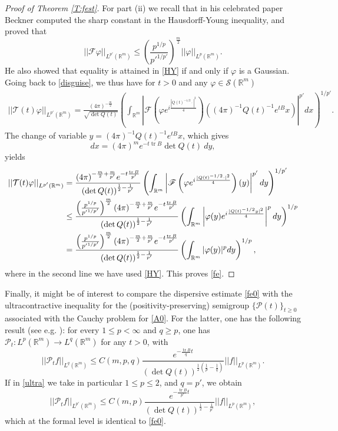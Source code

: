 \documentclass[11pt,a4paper]{amsart}
\def \vf{\varphi}
\newcommand{\Rm}{\mathbb R^m}
\numberwithin{equation}{section}
\newcommand{\tr}{\operatorname{tr}}
\numberwithin{equation}{section}
\begin{document}
\begin{proof}[Proof of Theorem \ref{T:fest}]
For part (ii) we recall that in his celebrated paper \cite{Be} Beckner  computed the sharp constant in the Hausdorff-Young inequality, and proved that 
\begin{equation}\label{HY}
||\mathscr F \vf||_{L^{p'}(\Rm)} \le \left(\frac{p^{1/p}}{{p'}^{1/p'}}\right)^{\frac m2} ||\vf||_{L^{p}(\Rm)}.
\end{equation}
He also showed that equality is attained in \eqref{HY} if and only if $\vf$ is a Gaussian.
Going back to \eqref{disguise}, we thus have for $t>0$ and any $\vf\in \mathscr S(\Rm)$
\begin{align*}
||\mathcal T(t) \vf||_{L^{p'}(\Rm)} = \frac{(4\pi
)^{-\frac{m}{2}}}{\sqrt{\det Q(t)}}\left(\int_{\Rm} \left|\mathscr F\left(\vf e^{i \frac{|Q(t)^{-1/2} \cdot|^2}{4}}\right)((4\pi)^{-1} Q(t)^{-1} e^{tB} x)\right|^{p'} dx\right)^{1/p'}.
\end{align*}
The change of variable $y = (4\pi)^{-1} Q(t)^{-1} e^{tB} x$, which gives 
\[
dx = (4\pi)^m e^{-t \tr B} \det Q(t)\ d y,
\]
yields
\begin{align*}
||\mathcal T(t) \vf||_{L^{p'}(\Rm)} & = \frac{(4\pi
)^{-\frac{m}{2}+\frac{m}{p'}} e^{-t {\frac{\tr B}{p'}}}}{(\det Q(t))^{\frac 12 - \frac 1{p'}}}\left(\int_{\Rm} \left|\mathscr F\left(\vf e^{i \frac{|Q(t)^{-1/2} \cdot|^2}{4}}\right)(y)\right|^{p'} dy\right)^{1/p'}
\\
& \le \frac{\left(\frac{p^{1/p}}{{p'}^{1/p'}}\right)^{\frac m2}(4\pi
)^{-\frac{m}{2}+\frac{m}{p'}} e^{-t {\frac{\tr B}{p'}}}}{(\det Q(t))^{\frac 12 - \frac 1{p'}}}\left(\int_{\Rm} \left|\vf(y) e^{i \frac{|Q(t)^{-1/2} y|^2}{4}}\right|^{p} dy\right)^{1/p}
\notag
\\
& = \frac{\left(\frac{p^{1/p}}{{p'}^{1/p'}}\right)^{\frac m2} (4\pi
)^{-\frac{m}{2}+\frac{m}{p'}} e^{-t {\frac{\tr B}{p'}}}}{(\det Q(t))^{\frac 12 - \frac 1{p'}}}\left(\int_{\Rm} |\vf(y)|^{p} dy\right)^{1/p},
\notag
\end{align*}
where in the second line we have used \eqref{HY}. This proves \eqref{fe}.
\end{proof}

Finally, it might be of interest to compare the dispersive estimate \eqref{fe0} with the ultracontractive inequality for the (positivity-preserving) semigroup $\{\mathcal P(t)\}_{t\ge 0}$ associated with the Cauchy problem for \eqref{A0}. For the latter, one has the following result (see e.g. \cite[Proposition 2.3]{G&liarNA}): for every $1\leq p< \infty$ and $q\geq p$, one has $\mathcal P_t: L^p(\Rm) \to L^q(\Rm)$ for any $t>0$, with
\begin{equation}\label{ultra}
||\mathcal P_t f||_{L^q(\Rm)} \le C(m,p,q) \frac{e^{- \frac{\operatorname{tr} B}{q} t}}{(\det Q(t))^{\frac 12(\frac{1}{p}-\frac{1}{q})}} ||f||_{L^p(\Rm)}.
\end{equation}
If in \eqref{ultra} we take in particular $1\le p\le 2$, and $q = p'$, we obtain 
\begin{equation*}
||\mathcal P_t f||_{L^{p'}(\Rm)} \le C(m,p) \frac{e^{-  \frac{\operatorname{tr} B}{p'} t}}{(\det Q(t))^{\frac{1}{2}-\frac{1}{p'}}} ||f||_{L^{p}(\Rm)},
\end{equation*}
which at the formal level is identical to \eqref{fe0}. 
\end{document}
